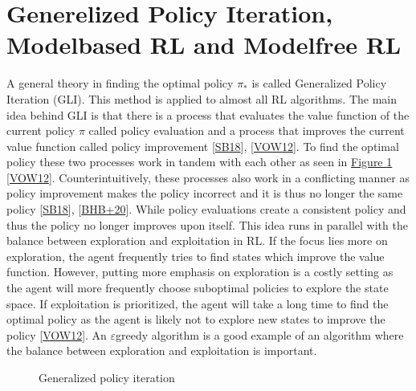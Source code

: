 \documentclass[letterpaper,10pt,english]{jupyterBook}
\let\sphinxpxdimen\pdfpxdimen\else\newdimen\sphinxpxdimen
\begin{document}
\section{Generelized Policy Iteration, Model\sphinxhyphen{}based RL and Model\sphinxhyphen{}free RL}
\label{\detokenize{Reinforcement_learning:generelized-policy-iteration-model-based-rl-and-model-free-rl}}
\sphinxAtStartPar
A general theory in finding the optimal policy \(\pi_*\) is called Generalized Policy Iteration (GLI). This method is applied to almost all RL algorithms. The main idea behind GLI is that there is a process that evaluates the value function of the current policy \(\pi\) called policy evaluation and a process that improves the current value function called policy improvement {[}\hyperlink{cite.Discussion:id70}{SB18}{]}, {[}\hyperlink{cite.Discussion:id42}{VOW12}{]}. To find the optimal policy these two processes work in tandem with each other as seen in \hyperref[\detokenize{Reinforcement_learning:gpi-fig}]{Figure \ref{\detokenize{Reinforcement_learning:gpi-fig}}} {[}\hyperlink{cite.Discussion:id42}{VOW12}{]}. Counterintuitively, these processes also work in a conflicting manner as policy improvement makes the policy incorrect and it is thus no longer the same policy {[}\hyperlink{cite.Discussion:id70}{SB18}{]},  {[}\hyperlink{cite.Discussion:id40}{BHB+20}{]}. While policy evaluations create a consistent policy and thus the policy no longer improves upon itself. This idea runs in parallel with the balance between exploration and exploitation in RL.  If the focus lies more on exploration, the agent frequently tries to find states which improve the value function. However, putting more emphasis on exploration is a costly setting as the agent will more frequently choose suboptimal policies to explore the state space. If exploitation is prioritized, the agent will take a long time to find the optimal policy as the agent is likely not to explore new states to improve the policy {[}\hyperlink{cite.Discussion:id42}{VOW12}{]}.  An \(\varepsilon\)\sphinxhyphen{}greedy algorithm is a good example of an algorithm where the balance between exploration and exploitation is important.

\begin{figure}[htbp]
\centering
\capstart

\noindent\sphinxincludegraphics[width=500\sphinxpxdimen,height=300\sphinxpxdimen]{{GPI}.png}
\caption{Generalized policy iteration}\label{\detokenize{Reinforcement_learning:gpi-fig}}\end{figure}
\end{document}
